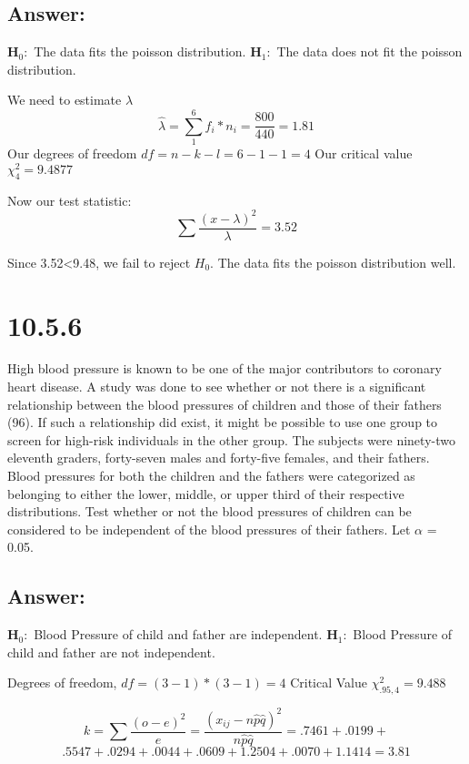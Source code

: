 \documentclass[svgnames]{article}
\begin{document}
\subsection*{Answer:}
\textbf{H$_0:$} The data fits the poisson distribution.
\newline
\textbf{H$_1:$} The data does not fit the poisson distribution.
\newline

We need to estimate $\lambda$
$$\hat{\lambda} = \sum^{6}_{1} f_i*n_i=\frac{800}{440}=1.81$$
Our degrees of freedom $df=n-k-l=6-1-1=4$
Our critical value $\chi^2_{4}=9.4877$

Now our test statistic:
$$\sum\frac{(x-\lambda)^2}{\lambda}=3.52$$

Since 3.52<9.48, we fail to reject $H_0$. The data fits the poisson distribution well. 


\section{10.5.6}
High blood pressure is known to be one of the major contributors to coronary heart disease. A study was done to see whether or not there is a significant relationship between the blood pressures of children and those of their fathers (96). If such a relationship did exist, it might be possible to use one group to screen for high-risk individuals in the other group. The subjects were ninety-two eleventh graders, forty-seven males and forty-five females, and their fathers. Blood pressures for both the children and the fathers were categorized as belonging to either the lower, middle, or upper third of their respective distributions. Test whether or not the blood pressures of children can be considered to be independent of the blood pressures of their fathers. Let $\alpha$ = 0.05.

\subsection*{Answer:}
\textbf{H$_0:$} Blood Pressure of child and father are independent. 
\newline
\textbf{H$_1:$} Blood Pressure of child and father are not independent.
\newline

Degrees of freedom, $df=(3-1)*(3-1)=4$
Critical Value $\chi^2_{.95,4}=9.488$

$$k=\sum\frac{(o-e)^2}{e}= \frac{(x_{ij}-n\hat{p}\hat{q})^2}{n\hat{p}\hat{q}}= .7461+.0199+$$
$$.5547+.0294+.0044+.0609+1.2504+.0070+1.1414 = 3.81$$
\end{document}
